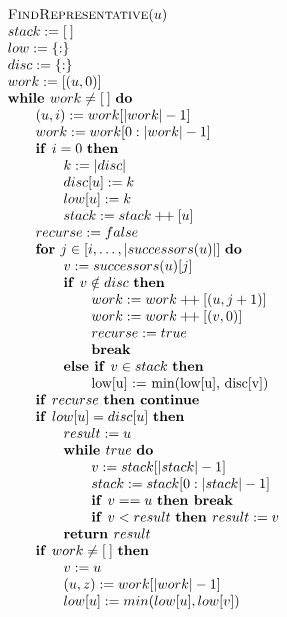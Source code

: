 \documentclass{article}
\newcommand{\concat}{\ensuremath{+\!\!+\:}}
\newcommand{\emptymap}{\ensuremath{\{ : \}}}
\newcommand{\emptylist}{\ensuremath{[\:]}}
\newcommand{\Space}{\text{\ }}
\newcommand{\If}{\text{\textbf{if }}}
\newcommand{\Do}{\text{\textbf{do }}}
\newcommand{\Then}{\text{\textbf{then }}}
\newcommand{\Else}{\text{\textbf{else }}}
\newcommand{\For}{\text{\textbf{for }}}
\newcommand{\While}{\text{\textbf{while }}}
\newcommand{\Break}{\text{\textbf{break }}}
\newcommand{\Continue}{\text{\textbf{continue }}}
\newcommand{\Return}{\text{\textbf{return }}}
\begin{document}
\[
\begin{tabular}{l}
\textsc{FindRepresentative}$(u)$ \\
$stack := \emptylist$ \\
$low := \emptymap$ \\
$disc := \emptymap$ \\
$work := [(u, 0)]$ \\
$\While work \neq \emptylist \Space \Do$ \\
\qquad $(u, i) := work[|work| - 1]$ \\
\qquad $work := work[0 : |work| - 1]$ \\
\qquad $\If i = 0 \Space \Then$ \\
\qquad \qquad $k := |disc|$ \\
\qquad \qquad $disc[u] := k$ \\
\qquad \qquad $low[u] := k$ \\
\qquad \qquad $stack := stack \concat [u]$ \\
\qquad $recurse := false$ \\
\qquad $\For j \in [i, \ldots, |successors(u)|]$ \Do \\
\qquad \qquad $v := successors(u)[j]$ \\
\qquad \qquad $\If v \notin disc$ \Then \\
\qquad \qquad \qquad $work := work \concat [(u, j+1)]$ \\
\qquad \qquad \qquad $work := work \concat [(v, 0)]$ \\
\qquad \qquad \qquad $recurse := true$ \\
\qquad \qquad \qquad \Break \\
\qquad \qquad \Else \If $v \in stack$ \Then \\
\qquad \qquad \qquad low[u] := min(low[u], disc[v]) \\
\qquad $\If recurse$ \Then \Continue \\
\qquad \If $low[u] = disc[u]$ \Then \\
\qquad \qquad $result := u$ \\
\qquad \qquad \While $true$ \Do \\
\qquad \qquad \qquad $v := stack[|stack| - 1]$ \\
\qquad \qquad \qquad $stack := stack[0:|stack| - 1]$ \\
\qquad \qquad \qquad \If $v == u$ \Then \Break \\
\qquad \qquad \qquad $\If v < result \Space \Then result := v$ \\
\qquad \qquad $\Return result$ \\
\qquad $\If work \neq \emptylist \Space \Then$ \\
\qquad \qquad $v := u$ \\
\qquad \qquad $(u, z) := work[|work| - 1]$\\
\qquad \qquad $low[u] := min(low[u], low[v])$ \\
\end{tabular}
\]

\newpage


\end{document}
